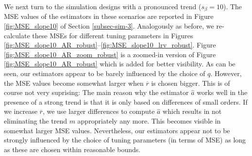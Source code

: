 We next turn to the simulation designs with a pronounced trend ($s_\beta = 10$). The MSE values of the estimators in these scenarios are reported in Figure \ref{fig:MSE_slope10} of Section \ref{subsec-sim-3}. Analogously as before, we re-calculate these MSEs for different tuning parameters in Figures \ref{fig:MSE_slope10_AR_robust}--\ref{fig:MSE_slope10_lrv_robust}. Figure \ref{fig:MSE_slope10_AR_zoom_robust} is a zoomed-in version of Figure \ref{fig:MSE_slope10_AR_robust} which is added for better visibility. As can be seen, our estimators appear to be barely influenced by the choice of $q$. However, the MSE values become somewhat larger when $\overline{r}$ is chosen bigger. This is of course not very suprising: The main reason why the estimator $\widehat{a}$ works well in the presence of a strong trend is that it is only based on differences of small orders. If we increase $\overline{r}$, we use larger differences to compute $\widehat{a}$ which results in not eliminating the trend $m$ appropriately any more. This becomes visible in somewhat larger MSE values. Nevertheless, our estimators appear not to be strongly influenced by the choice of tuning parameters (in terms of MSE) as long as these are chosen within reasonable bounds. 


